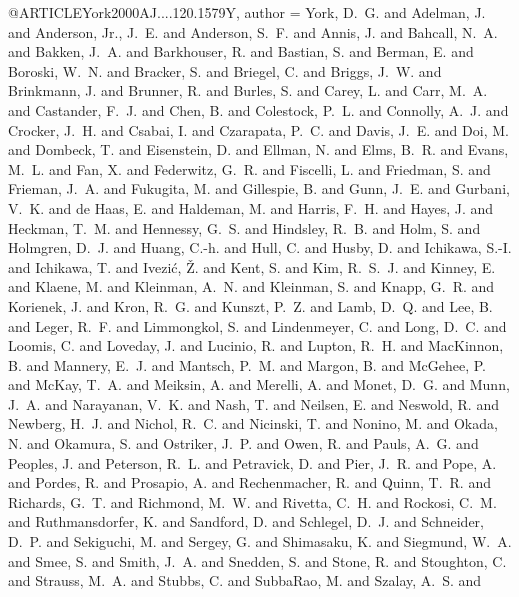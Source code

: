 \documentclass[twocolumn]{aastex62}
\begin{document}
 
@ARTICLE{York2000AJ....120.1579Y,
   author = {{York}, D.~G. and {Adelman}, J. and {Anderson}, Jr., J.~E. and 
	{Anderson}, S.~F. and {Annis}, J. and {Bahcall}, N.~A. and {Bakken}, J.~A. and 
	{Barkhouser}, R. and {Bastian}, S. and {Berman}, E. and {Boroski}, W.~N. and 
	{Bracker}, S. and {Briegel}, C. and {Briggs}, J.~W. and {Brinkmann}, J. and 
	{Brunner}, R. and {Burles}, S. and {Carey}, L. and {Carr}, M.~A. and 
	{Castander}, F.~J. and {Chen}, B. and {Colestock}, P.~L. and 
	{Connolly}, A.~J. and {Crocker}, J.~H. and {Csabai}, I. and 
	{Czarapata}, P.~C. and {Davis}, J.~E. and {Doi}, M. and {Dombeck}, T. and 
	{Eisenstein}, D. and {Ellman}, N. and {Elms}, B.~R. and {Evans}, M.~L. and 
	{Fan}, X. and {Federwitz}, G.~R. and {Fiscelli}, L. and {Friedman}, S. and 
	{Frieman}, J.~A. and {Fukugita}, M. and {Gillespie}, B. and 
	{Gunn}, J.~E. and {Gurbani}, V.~K. and {de Haas}, E. and {Haldeman}, M. and 
	{Harris}, F.~H. and {Hayes}, J. and {Heckman}, T.~M. and {Hennessy}, G.~S. and 
	{Hindsley}, R.~B. and {Holm}, S. and {Holmgren}, D.~J. and {Huang}, C.-h. and 
	{Hull}, C. and {Husby}, D. and {Ichikawa}, S.-I. and {Ichikawa}, T. and 
	{Ivezi{\'c}}, {\v Z}. and {Kent}, S. and {Kim}, R.~S.~J. and 
	{Kinney}, E. and {Klaene}, M. and {Kleinman}, A.~N. and {Kleinman}, S. and 
	{Knapp}, G.~R. and {Korienek}, J. and {Kron}, R.~G. and {Kunszt}, P.~Z. and 
	{Lamb}, D.~Q. and {Lee}, B. and {Leger}, R.~F. and {Limmongkol}, S. and 
	{Lindenmeyer}, C. and {Long}, D.~C. and {Loomis}, C. and {Loveday}, J. and 
	{Lucinio}, R. and {Lupton}, R.~H. and {MacKinnon}, B. and {Mannery}, E.~J. and 
	{Mantsch}, P.~M. and {Margon}, B. and {McGehee}, P. and {McKay}, T.~A. and 
	{Meiksin}, A. and {Merelli}, A. and {Monet}, D.~G. and {Munn}, J.~A. and 
	{Narayanan}, V.~K. and {Nash}, T. and {Neilsen}, E. and {Neswold}, R. and 
	{Newberg}, H.~J. and {Nichol}, R.~C. and {Nicinski}, T. and 
	{Nonino}, M. and {Okada}, N. and {Okamura}, S. and {Ostriker}, J.~P. and 
	{Owen}, R. and {Pauls}, A.~G. and {Peoples}, J. and {Peterson}, R.~L. and 
	{Petravick}, D. and {Pier}, J.~R. and {Pope}, A. and {Pordes}, R. and 
	{Prosapio}, A. and {Rechenmacher}, R. and {Quinn}, T.~R. and 
	{Richards}, G.~T. and {Richmond}, M.~W. and {Rivetta}, C.~H. and 
	{Rockosi}, C.~M. and {Ruthmansdorfer}, K. and {Sandford}, D. and 
	{Schlegel}, D.~J. and {Schneider}, D.~P. and {Sekiguchi}, M. and 
	{Sergey}, G. and {Shimasaku}, K. and {Siegmund}, W.~A. and {Smee}, S. and 
	{Smith}, J.~A. and {Snedden}, S. and {Stone}, R. and {Stoughton}, C. and 
	{Strauss}, M.~A. and {Stubbs}, C. and {SubbaRao}, M. and {Szalay}, A.~S. and 
}}
\end{document}
